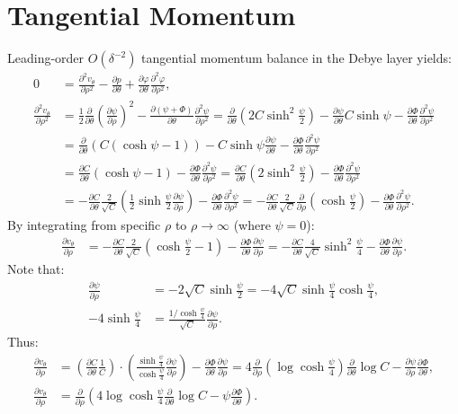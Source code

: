 \documentclass[MSc,beforeExam]{iitcsthesis}
\newcommand{\deriv}[2]{\frac{\partial #1}{\partial #2}}
\newcommand{\pars}[1]{\left(#1\right)}
\newcommand{\half}{\frac{1}{2}}
\begin{document}
\section{Tangential Momentum}
Leading-order $O(\delta^{-2})$ tangential momentum balance in the Debye layer yields:
\begin{align} 
\nonumber
0 &= \deriv{^2 v_\theta}{\rho^2} - \deriv{p}{\theta} 
 + \deriv{\varphi}{\theta} \deriv{^2\varphi}{\rho^2} ,
\\ \nonumber
\deriv{^2 v_\theta}{\rho^2} &= \frac{1}{2}\deriv{}{\theta}\pars{\deriv{\psi}{\rho}}^2
- \deriv{(\psi + \varPhi)}{\theta} \deriv{^2\psi}{\rho^2}  
 = \deriv{}{\theta}\pars{2C \sinh^2\frac{\psi}{2}}
- \deriv{\psi}{\theta} C \sinh\psi
- \deriv{\varPhi}{\theta} \deriv{^2\psi}{\rho^2}  
\\
 &= \deriv{}{\theta}\pars{C \pars{\cosh\psi - 1}}
- C \sinh\psi \deriv{\psi}{\theta}
- \deriv{\varPhi}{\theta} \deriv{^2\psi}{\rho^2}  
\\ \nonumber
 &= \deriv{C}{\theta} \pars{\cosh\psi - 1}
- \deriv{\varPhi}{\theta} \deriv{^2\psi}{\rho^2}  
 = \deriv{C}{\theta} \pars{2 \sinh^2 \frac{\psi}{2}}
- \deriv{\varPhi}{\theta} \deriv{^2\psi}{\rho^2}  
\\ \nonumber
 &= -\deriv{C}{\theta} \frac{2}{\sqrt{C}} \pars{\half \sinh \frac{\psi}{2} \deriv{\psi}{\rho}}
- \deriv{\varPhi}{\theta} \deriv{^2\psi}{\rho^2}  
 = -\deriv{C}{\theta} \frac{2}{\sqrt{C}} \deriv{}{\rho}\pars{\cosh \frac{\psi}{2}}
- \deriv{\varPhi}{\theta} \deriv{^2\psi}{\rho^2}  .
\end{align}
By integrating from specific $\rho$ to $\rho \rightarrow \infty$ (where $\psi = 0$):
\begin{align}
\deriv{v_\theta}{\rho} &= -\deriv{C}{\theta} \frac{2}{\sqrt{C}} 
\pars{\cosh \frac{\psi}{2} - 1} - \deriv{\varPhi}{\theta} \deriv{\psi}{\rho}   
= -\deriv{C}{\theta} \frac{4}{\sqrt{C}} \sinh^2 \frac{\psi}{4} 
  - \deriv{\varPhi}{\theta} \deriv{\psi}{\rho}   .
\end{align}
Note that:
\begin{align}
\deriv{\psi}{\rho} &= -2\sqrt{C}\sinh\frac{\psi}{2} = 
                       -4\sqrt{C}\sinh\frac{\psi}{4}\cosh\frac{\psi}{4},
\\
-4\sinh\frac{\psi}{4} &= \frac{1 / \cosh\frac{\psi}{4}}{\sqrt{C}} \deriv{\psi}{\rho}.
\end{align}
Thus:
\begin{align}
\deriv{v_\theta}{\rho} &= 
  \pars{\deriv{C}{\theta} \frac{1}{C}} \cdot
  \pars{\frac{\sinh\frac{\psi}{4}}{\cosh\frac{\psi}{4}} \deriv{\psi}{\rho}}
  - \deriv{\varPhi}{\theta} \deriv{\psi}{\rho}
=  4\deriv{}{\rho} \pars{\log\cosh\frac{\psi}{4}} \deriv{}{\theta} \log C
  - \deriv{\psi}{\rho} \deriv{\varPhi}{\theta},
\\
\deriv{v_\theta}{\rho} &= 
\deriv{}{\rho} \pars{ 4\log\cosh\frac{\psi}{4} \deriv{}{\theta} \log C
  - \psi \deriv{\varPhi}{\theta} }.
\end{align}
\end{document}
